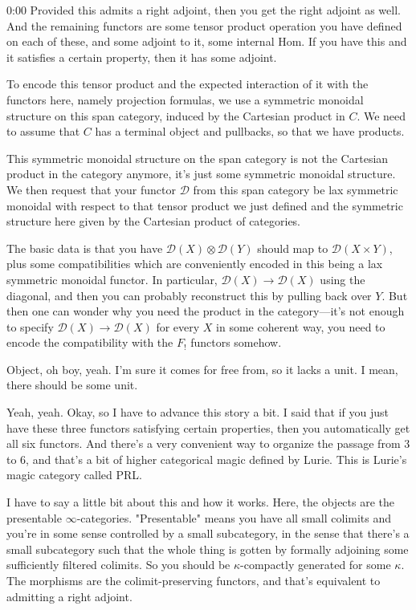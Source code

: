 \begin{unfinished}{0:00}
Provided this admits a right adjoint, then you get the right adjoint as well. And the remaining functors are some tensor product operation you have defined on each of these, and some adjoint to it, some internal Hom. If you have this and it satisfies a certain property, then it has some adjoint.

To encode this tensor product and the expected interaction of it with the functors here, namely projection formulas, we use a symmetric monoidal structure on this span category, induced by the Cartesian product in $C$. We need to assume that $C$ has a terminal object and pullbacks, so that we have products.

This symmetric monoidal structure on the span category is not the Cartesian product in the category anymore, it's just some symmetric monoidal structure. We then request that your functor $\mathcal{D}$ from this span category be lax symmetric monoidal with respect to that tensor product we just defined and the symmetric structure here given by the Cartesian product of categories.

The basic data is that you have $\mathcal{D}(X) \otimes \mathcal{D}(Y)$ should map to $\mathcal{D}(X \times Y)$, plus some compatibilities which are conveniently encoded in this being a lax symmetric monoidal functor. In particular, $\mathcal{D}(X) \to \mathcal{D}(X)$ using the diagonal, and then you can probably reconstruct this by pulling back over $Y$. But then one can wonder why you need the product in the category---it's not enough to specify $\mathcal{D}(X) \to \mathcal{D}(X)$ for every $X$ in some coherent way, you need to encode the compatibility with the $F_!$ functors somehow.


Object, oh boy, yeah. I'm sure it comes for free from, so it lacks a unit. I mean, there should be some unit.

Yeah, yeah. Okay, so I have to advance this story a bit. I said that if you just have these three functors satisfying certain properties, then you automatically get all six functors. And there's a very convenient way to organize the passage from 3 to 6, and that's a bit of higher categorical magic defined by Lurie. This is Lurie's magic category called PRL.

I have to say a little bit about this and how it works. Here, the objects are the presentable $\infty$-categories. "Presentable" means you have all small colimits and you're in some sense controlled by a small subcategory, in the sense that there's a small subcategory such that the whole thing is gotten by formally adjoining some sufficiently filtered colimits. So you should be $\kappa$-compactly generated for some $\kappa$. The morphisms are the colimit-preserving functors, and that's equivalent to admitting a right adjoint.


\end{unfinished}
